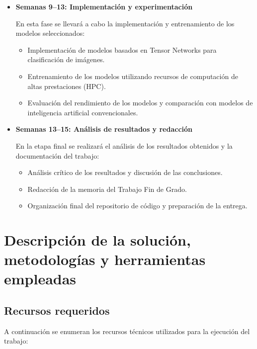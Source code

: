 \documentclass[11pt,a4paper]{report}
\begin{document}
\begin{itemize}
\item \textbf{Semanas 9--13: Implementación y experimentación}

En esta fase se llevará a cabo la implementación y entrenamiento de los modelos seleccionados:
\begin{itemize}
\item Implementación de modelos basados en Tensor Networks para clasificación de imágenes.
\item Entrenamiento de los modelos utilizando recursos de computación de altas prestaciones (HPC).
\item Evaluación del rendimiento de los modelos y comparación con modelos de inteligencia artificial convencionales.
\end{itemize}

\item \textbf{Semanas 13--15: Análisis de resultados y redacción}

En la etapa final se realizará el análisis de los resultados obtenidos y la documentación del trabajo:
\begin{itemize}
\item Análisis crítico de los resultados y discusión de las conclusiones.
\item Redacción de la memoria del Trabajo Fin de Grado.
\item Organización final del repositorio de código y preparación de la entrega.
\end{itemize}
\end{itemize}

\section{Descripci\'on de la soluci\'on, metodolog\'ias y herramientas empleadas}

\subsection{Recursos requeridos}
A continuación se enumeran los recursos técnicos utilizados para la ejecución del trabajo:
\end{document}
